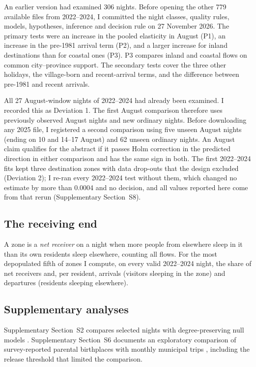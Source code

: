 \documentclass[pdflatex,sn-mathphys-num,referee]{sn-jnl}
\begin{document}
An earlier version had examined 306 nights. Before opening the other 779 available files from 2022--2024, I committed the night classes, quality rules, models, hypotheses, inference and decision rule on 27 November 2026. The primary tests were an increase in the pooled elasticity in August (P1), an increase in the pre-1981 arrival term (P2), and a larger increase for inland destinations than for coastal ones (P3). P3 compares inland and coastal flows on common city--province support. The secondary tests cover the three other holidays, the village-born and recent-arrival terms, and the difference between pre-1981 and recent arrivals.

All 27 August-window nights of 2022--2024 had already been examined. I recorded this as Deviation 1. The first August comparison therefore uses previously observed August nights and new ordinary nights. Before downloading any 2025 file, I registered a second comparison using five unseen August nights (ending on 10 and 14--17 August) and 62 unseen ordinary nights. An August claim qualifies for the abstract if it passes Holm correction in the predicted direction in either comparison and has the same sign in both. The first 2022--2024 fits kept three destination zones with data drop-outs that the design excluded (Deviation 2); I re-ran every 2022--2024 test without them, which changed no estimate by more than 0.0004 and no decision, and all values reported here come from that rerun (Supplementary Section~S8).

\subsection{The receiving end}

A zone is a \emph{net receiver} on a night when more people from elsewhere sleep in it than its own residents sleep elsewhere, counting all flows. For the most depopulated fifth of zones I compute, on every valid 2022--2024 night, the share of net receivers and, per resident, arrivals (visitors sleeping in the zone) and departures (residents sleeping elsewhere).

\subsection{Supplementary analyses}

Supplementary Section~S2 compares selected nights with degree-preserving null models \cite{maslov2002specificity,zhou2007structural,zhou2017second,vanwijk2010comparing,krings2012effects,cimini2019statistical}. Supplementary Section~S6 documents an exploratory comparison of survey-reported parental birthplaces with monthly municipal trips \cite{ine2023ecepovmicro,ine2026turismomoviles}, including the release threshold that limited the comparison.
\end{document}
